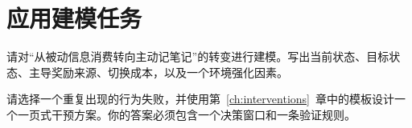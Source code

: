 \section{应用建模任务}

\begin{exercisebox}
\begin{exercise}
请对“从被动信息消费转向主动记笔记”的转变进行建模。写出当前状态、目标状态、主导奖励来源、切换成本，以及一个环境强化因素。
\end{exercise}

\begin{exercise}
请选择一个重复出现的行为失败，并使用第~\ref{ch:interventions}~章中的模板设计一个一页式干预方案。你的答案必须包含一个决策窗口和一条验证规则。
\end{exercise}
\end{exercisebox}